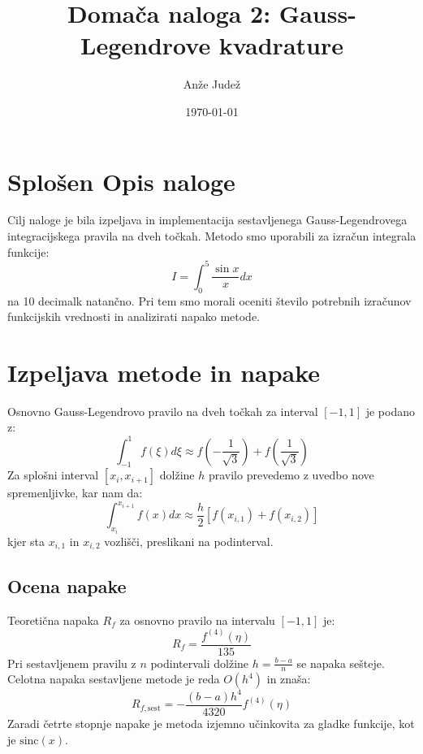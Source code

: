 \documentclass[11pt, a4paper]{article}
\title{Domača naloga 2: Gauss-Legendrove kvadrature}
\author{Anže Judež}
\date{\today}
\begin{document}
\maketitle

\section{Splošen Opis naloge}
Cilj naloge je bila izpeljava in implementacija sestavljenega Gauss-Legendrovega integracijskega pravila na dveh točkah. Metodo smo uporabili za izračun integrala funkcije:
\begin{equation}
    I = \int_{0}^{5} \frac{\sin x}{x} dx
\end{equation}
na 10 decimalk natančno. Pri tem smo morali oceniti število potrebnih izračunov funkcijskih vrednosti in analizirati napako metode.

\section{Izpeljava metode in napake}
Osnovno Gauss-Legendrovo pravilo na dveh točkah za interval $[-1, 1]$ je podano z:
\begin{equation}
    \int_{-1}^{1} f(\xi) d\xi \approx f\left(-\frac{1}{\sqrt{3}}\right) + f\left(\frac{1}{\sqrt{3}}\right)
\end{equation}
Za splošni interval $[x_i, x_{i+1}]$ dolžine $h$ pravilo prevedemo z uvedbo nove spremenljivke, kar nam da:
\begin{equation}
    \int_{x_i}^{x_{i+1}} f(x) dx \approx \frac{h}{2} \left[ f(x_{i,1}) + f(x_{i,2}) \right]
\end{equation}
kjer sta $x_{i,1}$ in $x_{i,2}$ vozlišči, preslikani na podinterval.

\subsection{Ocena napake}
Teoretična napaka $R_f$ za osnovno pravilo na intervalu $[-1, 1]$ je:
\begin{equation}
    R_f = \frac{f^{(4)}(\eta)}{135}
\end{equation}
Pri sestavljenem pravilu z $n$ podintervali dolžine $h = \frac{b-a}{n}$ se napaka sešteje. Celotna napaka sestavljene metode je reda $O(h^4)$ in znaša:
\begin{equation}
    R_{f, \text{sest}} = -\frac{(b-a)h^4}{4320} f^{(4)}(\eta)
\end{equation}
Zaradi četrte stopnje napake je metoda izjemno učinkovita za gladke funkcije, kot je $\text{sinc}(x)$.
\end{document}
